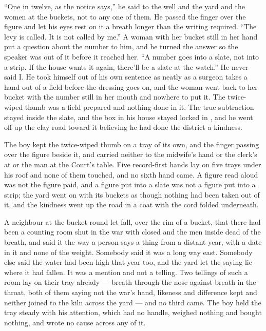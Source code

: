 “One in twelve, as the notice says,” he said to the well and the yard and the women at the buckets, not to any one of them. He passed the finger over the figure and let his eyes rest on it a breath longer than the writing required. “The levy is called. It is not called by me.” A woman with her bucket still in her hand put a question about the number to him, and he turned the answer so the speaker was out of it before it reached her. “A number goes into a slate, not into a strip. If the house wants it again, there'll be a slate at the watch.” He never said I. He took himself out of his own sentence as neatly as a surgeon takes a hand out of a field before the dressing goes on, and the woman went back to her bucket with the number still in her mouth and nowhere to put it. The twice-wiped thumb was a field prepared and nothing done in it. The true subtraction stayed inside the slate, and the box in his house stayed locked in , and he went off up the clay road toward it believing he had done the district a kindness.

The boy kept the twice-wiped thumb on a tray of its own, and the finger passing over the figure beside it, and carried neither to the midwife's hand or the clerk's at  or the man at the Court's table. Five record-first hands lay on five trays under his roof and none of them touched, and no sixth hand came. A figure read aloud was not the figure paid, and a figure put into a slate was not a figure put into a strip; the yard went on with its buckets as though nothing had been taken out of it, and the kindness went up the road in a coat with the cord folded underneath.

A neighbour at the bucket-round let fall, over the rim of a bucket, that there had been a counting room shut in the war with  closed and the men inside dead of the breath, and said it the way a person says a thing from a distant year, with a date in it and none of the weight. Somebody said it was a long way east. Somebody else said the water had been high that year too, and the yard let the saying lie where it had fallen. It was a mention and not a telling. Two tellings of such a room lay on their tray already --- breath through the nose against breath in the throat, both of them saying not the war's hand, likeness and difference kept and neither joined to the kiln across the yard --- and no third came. The boy held the tray steady with his attention, which had no handle, weighed nothing and bought nothing, and wrote no cause across any of it.

